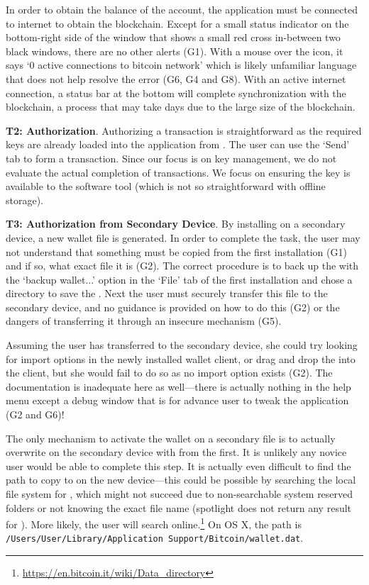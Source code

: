 In order to obtain the balance of the account, the application must be connected to internet to obtain the blockchain. Except for a small status indicator on the bottom-right side of the window that shows a small red cross in-between two black windows, there are no other alerts (G1). With a mouse over the icon, it says `0 active connections to bitcoin network' which is likely unfamiliar language that does not help resolve the error (G6, G4 and G8). With an active internet connection, a status bar at the bottom will complete synchronization with the blockchain, a process that may take days due to the large size of the blockchain. 

\textbf{T2: Authorization}.
Authorizing a transaction is straightforward as the required keys are already loaded into the application from \walletfile. The user can use the `Send' tab to form a transaction. Since our focus is on key management, we do not evaluate the actual completion of transactions. We focus on ensuring the key is available to the software tool (which is not so straightforward with \eg offline storage). 

\textbf{T3: Authorization from Secondary Device}.
By installing \bitcoinclient on a secondary device, a new wallet file is generated. In order to complete the task, the user may not understand that something must be copied from the first installation (G1) and if so, what exact file it is (G2). The correct procedure is to back up the \walletfile with the `backup wallet...' option in the `File' tab of the first installation and chose a directory to save the \walletfile. Next the user must securely transfer this file to the secondary device, and no guidance is provided on how to do this (G2) or the dangers of transferring it through an insecure mechanism (G5).

Assuming the user has transferred \walletfile to the secondary device, she could try looking for import options in the newly installed wallet client, or drag and drop the \walletfile into the client, but she would fail to do so as no import option exists (G2). The documentation is inadequate here as well---there is actually nothing in the help menu except a debug window that is for advance user to tweak the application (G2 and G6)!

The only mechanism to activate the wallet on a secondary file is to actually overwrite \walletfile on the secondary device with \walletfile from the first. It is unlikely any novice user would be able to complete this step. It is actually even difficult to find the path to copy \walletfile to on the new device---this could be possible by searching the local file system for \walletfile, which might not succeed due to non-searchable system reserved folders or not knowing the exact file name (spotlight does not return any result for \walletfile). More likely, the user will search online.\footnote{\url{https://en.bitcoin.it/wiki/Data_directory}} On OS X, the path is \texttt{/Users/User/Library/Application Support/Bitcoin/wallet.dat}.

